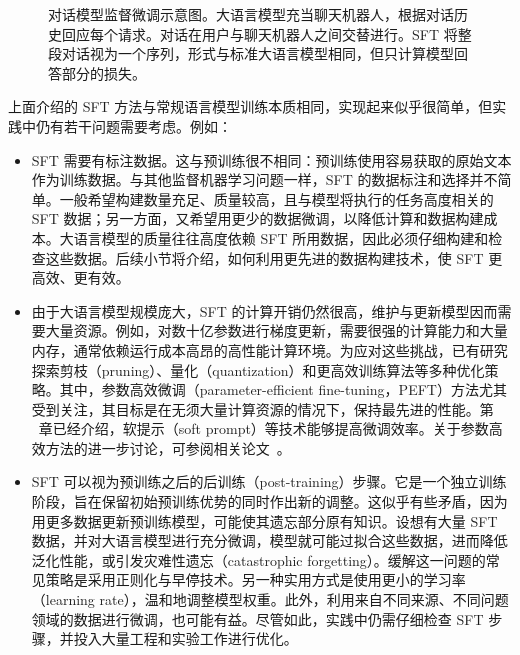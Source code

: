 \begin{figure}[!t]
\centering

\caption{对话模型监督微调示意图。大语言模型充当聊天机器人，根据对话历史回应每个请求。对话在用户与聊天机器人之间交替进行。SFT 将整段对话视为一个序列，形式与标准大语言模型相同，但只计算模型回答部分的损失。}
\label{fig:sft-conversational-models}
\end{figure}

上面介绍的 SFT 方法与常规语言模型训练本质相同，实现起来似乎很简单，但实践中仍有若干问题需要考虑。例如：

\begin{itemize}
\item \vspace{0.5em} SFT 需要有标注数据。这与预训练很不相同：预训练使用容易获取的原始文本作为训练数据。与其他监督机器学习问题一样，SFT 的数据标注和选择并不简单。一般希望构建数量充足、质量较高，且与模型将执行的任务高度相关的 SFT 数据；另一方面，又希望用更少的数据微调，以降低计算和数据构建成本。大语言模型的质量往往高度依赖 SFT 所用数据，因此必须仔细构建和检查这些数据。后续小节将介绍，如何利用更先进的数据构建技术，使 SFT 更高效、更有效。
\item \vspace{0.3em} 由于大语言模型规模庞大，SFT 的计算开销仍然很高，维护与更新模型因而需要大量资源。例如，对数十亿参数进行梯度更新，需要很强的计算能力和大量内存，通常依赖运行成本高昂的高性能计算环境。为应对这些挑战，已有研究探索剪枝（pruning）、量化（quantization）和更高效训练算法等多种优化策略。其中，参数高效微调（parameter-efficient fine-tuning，PEFT）方法尤其受到关注，其目标是在无须大量计算资源的情况下，保持最先进的性能。第 \ChapterLLMPrompting\ 章已经介绍，软提示（soft prompt）等技术能够提高微调效率。关于参数高效方法的进一步讨论，可参阅相关论文~\cite{houlsby-etal:2019parameter,hu-etal:2022lora,han-etal:2024parameter}。
\item \vspace{0.3em} SFT 可以视为预训练之后的后训练（post-training）步骤。它是一个独立训练阶段，旨在保留初始预训练优势的同时作出新的调整。这似乎有些矛盾，因为用更多数据更新预训练模型，可能使其遗忘部分原有知识。设想有大量 SFT 数据，并对大语言模型进行充分微调，模型就可能过拟合这些数据，进而降低泛化性能，或引发灾难性遗忘（catastrophic forgetting）。缓解这一问题的常见策略是采用正则化与早停技术。另一种实用方式是使用更小的学习率（learning rate），温和地调整模型权重。此外，利用来自不同来源、不同问题领域的数据进行微调，也可能有益。尽管如此，实践中仍需仔细检查 SFT 步骤，并投入大量工程和实验工作进行优化。
\end{itemize}
\vspace{0.5em}


